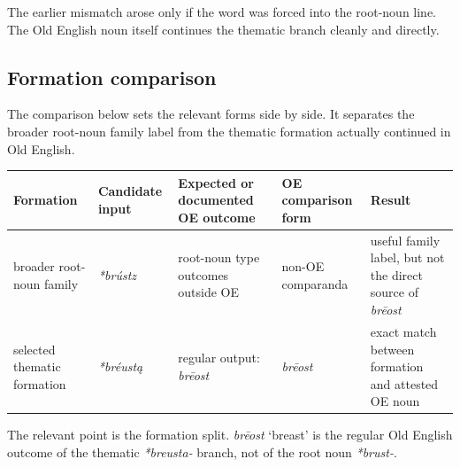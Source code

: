 \documentclass[
  british,
  a4paper,
  openany]{book}
\newcounter{none} %
\begin{document}
The earlier mismatch arose only if the word was forced into the
root-noun line. The Old English noun itself continues the thematic
branch cleanly and directly.

\subsection{Formation comparison}\label{formation-comparison}

The comparison below sets the relevant forms side by side. It separates
the broader root-noun family label from the thematic formation actually
continued in Old English.

{\def\LTcaptype{none} %
\begin{longtable}[]{@{}
  >{\raggedright\arraybackslash}p{}
  >{\raggedright\arraybackslash}p{}
  >{\raggedright\arraybackslash}p{}
  >{\raggedright\arraybackslash}p{}
  >{\raggedright\arraybackslash}p{}@{}}
\toprule\noalign{}
\begin{minipage}[b]{\linewidth}\raggedright
Formation
\end{minipage} & \begin{minipage}[b]{\linewidth}\raggedright
Candidate input
\end{minipage} & \begin{minipage}[b]{\linewidth}\raggedright
Expected or documented OE outcome
\end{minipage} & \begin{minipage}[b]{\linewidth}\raggedright
OE comparison form
\end{minipage} & \begin{minipage}[b]{\linewidth}\raggedright
Result
\end{minipage} \\
\midrule\noalign{}
\endhead
\bottomrule\noalign{}
\endlastfoot
broader root-noun family & {\emph{*brústz}} & root-noun type outcomes
outside OE & non-OE comparanda & useful family label, but not the direct
source of \emph{brēost} \\
selected thematic formation & {\emph{*bréustą}} & regular output:
\emph{brēost} & {\emph{brēost}} & exact match between formation and
attested OE noun \\
\end{longtable}
}

The relevant point is the formation split. {\emph{brēost}} `breast' is
the regular Old English outcome of the thematic {\emph{*breusta-}}
branch, not of the root noun {\emph{*brust-}}.
\end{document}
